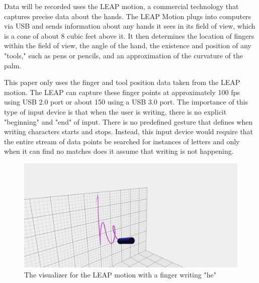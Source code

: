 Data will be recorded uses the LEAP motion, a commercial technology that captures precise data about the hands.
The LEAP Motion plugs into computers via USB and sends information about any hands it sees in its field of view, which is a cone of about 8 cubic feet above it.
It then determines the location of fingers within the field of view, the angle of the hand, the existence and position of any "tools," such as pens or pencils, and an approximation of the curvature of the palm.

This paper only uses the finger  and tool position data taken from the LEAP motion. The LEAP can capture these finger points at approximately 100 fps using USB 2.0 port or about 150 using a USB 3.0 port.
The importance of this type of input device is that when the user is writing, there is no explicit "beginning" and "end" of input. There is no predefined gesture that defines when writing characters starts and stops. Instead, this input device would require that the entire stream of data points be searched for instances of letters and only when it can find no matches does it assume that writing is not happening.
\begin{figure}
  \begin{center}
  \includegraphics[width=\columnwidth]{images/he-white.PNG}
  \caption{The visualizer for the LEAP motion with a finger writing "he"}
  \label{fig:teaser}
  \end{center}  
\end{figure}
